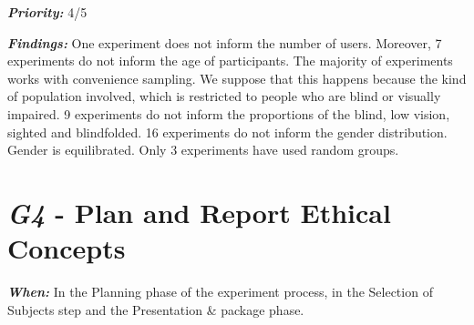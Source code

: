 \noindent \textit{\textbf{Priority:}}  4/5
\vspace{5mm}

\noindent \textit{\textbf{Findings:}} One experiment does not inform the number of users. Moreover, 7 experiments do not inform the age of participants. The majority of experiments works with convenience sampling. We suppose that this happens because the kind of population involved, which is restricted to people who are blind or visually impaired. 9 experiments do not inform the proportions of the blind, low vision, sighted and blindfolded. 16 experiments do not inform the gender distribution. Gender is equilibrated. Only 3 experiments have used random groups.
\vspace{5mm}

\section{\textit{G4} - Plan and Report Ethical Concepts}
\label{sec:guidelines-G4}
\vspace{5mm}

\noindent \textit{\textbf{When:}}  
In the Planning phase of the experiment process, in the Selection of Subjects step and the Presentation \& package phase.
\vspace{5mm}

